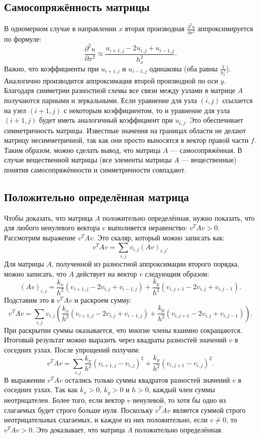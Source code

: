 \documentclass[a4paper, fleqn]{report}
\begin{document}
\subsection*{Самосопряжённость матрицы}
В одномерном случае в направлении $x$ вторая производная $\frac{\partial^2 u}{\partial x^2}$ аппроксимируется по формуле:
\[
\frac{\partial^2 u}{\partial x^2} \approx \frac{u_{i+1,j} - 2u_{i,j} + u_{i-1,j}}{h_x^2}.
\]
Важно, что коэффициенты при $u_{i+1,j}$ и $u_{i-1,j}$ одинаковы (оба равны $\frac{1}{h_x^2}$).  
Аналогично производится аппроксимация второй производной по оси $y$.
Благодаря симметрии разностной схемы все связи между узлами в матрице $A$ получаются парными и зеркальными. Если уравнение для узла $(i,j)$ ссылается на узел $(i+1,j)$ с некоторым коэффициентом, то и уравнение для узла $(i+1,j)$ будет иметь аналогичный коэффициент при $u_{i,j}$. Это обеспечивает симметричность матрицы. Известные значения на границах области не делают матрицу несимметричной, так как они просто выносятся в вектор правой части $f$. Таким образом, можно сделать вывод, что матрица $A$ — самосопряжённая. В случае вещественной матрицы (все элементы матрицы $A$ — вещественные) понятия самосопряжённости и симметричности совпадают.

\subsection*{Положительно определённая матрица}
Чтобы доказать, что матрица $A$ положительно определённая, нужно показать, что для любого ненулевого вектора $v$ выполняется неравенство: $v^T A v > 0$.
Рассмотрим выражение $v^T A v$. Это скаляр, который можно записать как:
\[
v^T A v = \sum_{i,j} v_{i,j} (Av)_{i,j}.
\]
Для матрицы $A$, полученной из разностной аппроксимации второго порядка, можно записать, что $A$ действует на вектор $v$ следующим образом:
\[
(Av)_{i,j} = \frac{k_x}{h^2}(v_{i+1,j} - 2v_{i,j} + v_{i-1,j}) + \frac{k_y}{h^2}(v_{i,j+1} - 2v_{i,j} + v_{i,j-1}).
\]
Подставим это в $v^T A v$ и раскроем сумму:
\[
v^T A v = \sum_{i,j} v_{i,j} \left( \frac{k_x}{h^2}(v_{i+1,j} - 2v_{i,j} + v_{i-1,j}) + \frac{k_y}{h^2}(v_{i,j+1} - 2v_{i,j} + v_{i,j-1}) \right).
\]
При раскрытии суммы оказывается, что многие члены взаимно сокращаются. Итоговый результат можно выразить через квадраты разностей значений $v$ в соседних узлах. После упрощений получим:
\[
v^T A v = \sum_{i,j} \frac{k_x}{h^2} (v_{i+1,j} - v_{i,j})^2 + \frac{k_y}{h^2} (v_{i,j+1} - v_{i,j})^2.
\]
В выражении $v^T A v$ остались только суммы квадратов разностей значений $v$ в соседних узлах. Так как $k_x > 0$, $k_y > 0$ и $h > 0$, каждый член суммы неотрицателен. Более того, если вектор $v$ ненулевой, то хотя бы одно из слагаемых будет строго больше нуля.
Поскольку $v^T A v$ является суммой строго неотрицательных слагаемых, и каждое из них положительно, если $v \neq 0$, то $v^T A v > 0$. Это доказывает, что матрица $A$ положительно определённая.
\end{document}

